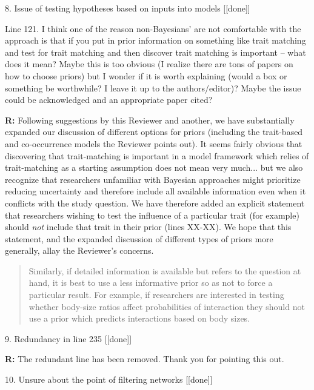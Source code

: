 \documentclass[12pt]{letter}
\newenvironment{refquote}{\bigskip \begin{it}}{\end{it}\smallskip}
\begin{document}
	8. Issue of testing hypotheses based on inputs into models [[done]]

		\begin{refquote}
		Line 121.  I think one of the reason non-Bayesians’ are not comfortable with the approach is that if you put in prior information on something like trait matching and test for trait matching and then discover trait matching is important – what does it mean?  Maybe this is too obvious (I realize there are tons of papers on how to choose priors) but I wonder if it is worth explaining (would a box or something be worthwhile?  I leave it up to the authors/editor)?  Maybe the issue could be acknowledged and an appropriate paper cited?
		\end{refquote}

		\textbf{R:} Following suggestions by this Reviewer and another, we have substantially expanded our discussion of different options for priors (including the trait-based and co-occurrence models the Reviewer points out). It seems fairly obvious that discovering that trait-matching is important in a model framework which relies of trait-matching as a starting assumption does not mean very much... but we also recognize that researchers unfamiliar with Bayesian approaches might prioritize reducing uncertainty and therefore include all available information even when it conflicts with the study question. We have therefore added an explicit statement that researchers wishing to test the influence of a particular trait (for example) should \emph{not} include that trait in their prior (lines XX-XX). We hope that this statement, and the expanded discussion of different types of priors more generally, allay the Reviewer's concerns. 

		\begin{quotation}
			Similarly, if detailed information is available but refers to the question at hand, it is best to use a less informative prior so as not to force a particular result. For example, if researchers are interested in testing whether body-size ratios affect probabilities of interaction they should not use a prior which predicts interactions based on body sizes.
		\end{quotation}


	9. Redundancy in line 235 [[done]]

		\textbf{R:} The redundant line has been removed. Thank you for pointing this out.


	10. Unsure about the point of filtering networks [[done]]
\end{document}
